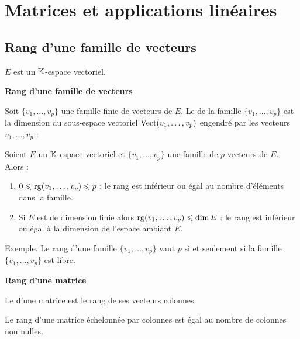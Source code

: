 \documentclass[10pt,class=article,crop=false]{standalone}
\begin{document}
	
\section{Matrices et applications linéaires}

\begin{multicols}{2}
	


\subsection{Rang d'une famille de vecteurs}

$E$ est un $\mathbb{K}$-espace vectoriel.


\textbf{Rang d'une famille de vecteurs}

Soit $\{v_1, \ldots ,v_p\}$ une famille finie de vecteurs de $E$.
Le  de la famille $\{v_1, \ldots ,v_p\}$
est la dimension du sous-espace vectoriel $\operatorname{Vect}(v_1, \ldots ,v_p)$
engendré par les vecteurs $v_1, \dots ,v_p$ :


\begin{proposition}
	Soient $E$ un $\mathbb{K}$-espace vectoriel et $\{v_1, \ldots ,v_p\}$
	une famille de $p$ vecteurs de $E$. Alors :
	\begin{enumerate}
		\item $0 \leqslant \operatorname{rg} (v_1, \ldots ,v_p) \leqslant p$ : le rang est inférieur ou égal au nombre d'éléments dans la famille.
		
		\item Si $E$ est de dimension finie alors $\operatorname{rg} (v_1, \ldots ,v_p) \leqslant \dim E$ :
		le rang est inférieur ou égal à la dimension de l'espace ambiant $E$.
	\end{enumerate}
\end{proposition}



Exemple. Le rang d'une famille $\{v_1, \ldots ,v_p\}$ vaut $p$ si et seulement si
la famille $\{v_1, \ldots ,v_p\}$ est libre.



\textbf{Rang d'une matrice}

Le  d'une matrice est le rang de ses vecteurs colonnes.

\begin{proposition}
	\label{prop:rangmatech}
	Le rang d'une matrice échelonnée par colonnes est égal au nombre
	de colonnes non nulles.
\end{proposition}


\end{multicols}
\end{document}
